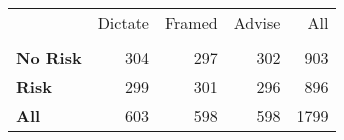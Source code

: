 \begin{tabular}{lrrrr}
\toprule
{} &  Dictate &  Framed &  Advise &   All \\
        &          &         &         &       \\
\midrule
\textbf{No Risk} &      304 &     297 &     302 &   903 \\
\textbf{Risk   } &      299 &     301 &     296 &   896 \\
\textbf{All    } &      603 &     598 &     598 &  1799 \\
\bottomrule
\end{tabular}
